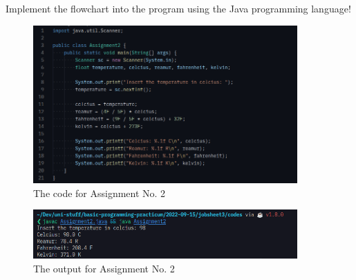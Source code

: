\documentclass[12pt,titlepage]{article}
\begin{document}
\begin{enumerate}
{        \pagebreak
        Implement the flowchart into the program using the Java programming language!

        \begin{figure}[h]
            \centering
            \includegraphics[width=0.9\textwidth]{./images/assignment2-code.png}
            \caption{The code for Assignment No. 2}
        \end{figure}
        \begin{figure}[h]
            \centering
            \includegraphics[width=0.9\textwidth]{./images/assignment2-output.png}
            \caption{The output for Assignment No. 2}
        \end{figure}
    }
\end{enumerate}
\end{document}
